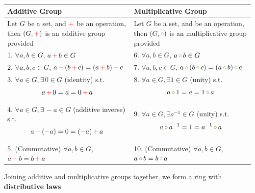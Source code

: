 \begin{center}
    {
    \renewcommand{\arraystretch}{2}
    \begin{tabular}{| m{20em} | m{20em} |}
        \hline
        Additive Group & Multiplicative Group\\
        \hline
        Let $G$ be a set, and ${\color{red} +}$ be an operation, 
        then $(G, {\color{red} +})$ is an additive group provided & 
        Let $G$ be a set, and  be an operation, 
        then $(G, {\color{extinctGreen} \circ})$ is an multiplicative group provided\\[1em]
        \hline
        1. $\forall a, b \in G$, $a \, {\color{red} +}\, b \in G$ & 
        6. $\forall a, b \in G$, $a \,{\color{extinctGreen} \circ}\, b \in G$\\[1em]
        \hline
        2. $\forall a, b, c \in G$, $a \, {\color{red} +}\, (b \, {\color{red} +}\, c ) = (a \, {\color{red} +}\, b) \, {\color{red} +}\, c $ & 
        7. $\forall a, b, c \in G$, $a \, {\color{extinctGreen} \circ}\, (b \, {\color{extinctGreen} \circ}\, c ) = (a \, {\color{extinctGreen} \circ}\, b) \, {\color{extinctGreen} \circ}\, c $\\[1em]
        \hline
        3. $\forall a \in G, \exists\, 0 \in G $ (identity) s.t. 
            \[a \, {\color{red} +} \, 0 = a = 0 \, {\color{red} +}\, a\] & 
        8. $\forall a \in G, \exists 1 \in G $ (unity) s.t. \[a \, {\color{extinctGreen} \circ}\, 1 = a = 1 \, {\color{extinctGreen} \circ} \, a\]\\[1em] 
        \hline
        
        4. $\forall a \in G, \exists\, -a \in G $ (additive inverse) s.t. 
            \[a \, {\color{red} +}\, (-a) = 0 = (-a)\, {\color{red} +}\, a\] & 
        9. $\forall a \in G, \exists a^{-1} \in G $ (unity) s.t. \[a \, {\color{extinctGreen} \circ}\, a^{-1} = 1 = a^{-1} \, {\color{extinctGreen} \circ}\, a\]\\[1em]
        \hline
        5. (Commutative) $\forall a, b \in G$, $a \, {\color{red} +}\, b = b \, {\color{red} +}\, a$ &
        10. (Commutative) $\forall a, b \in G$, $a \, {\color{extinctGreen} \circ}\, b = b \, {\color{extinctGreen} \circ}\, a$\\[1em]
        \hline
    \end{tabular}
    }
\end{center}

Joining additive and multiplicative groups together, we form a ring with \textbf{distributive laws}

